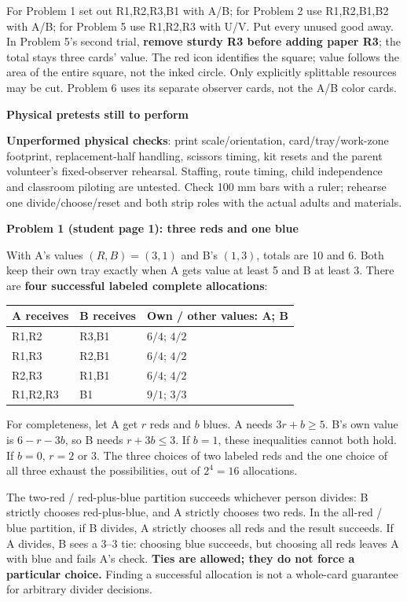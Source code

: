 \documentclass[11pt]{article}
\newcommand{\heading}[1]{\par\vspace{1.5mm}{\large\bfseries #1}\par\vspace{.8mm}}
\newcommand{\subhead}[1]{\par\vspace{1mm}\textbf{#1}\par}
\newcommand{\page}[1]{\newpage\heading{#1}}
\begin{document}
For Problem 1 set out R1,R2,R3,B1 with A/B; for Problem 2 use R1,R2,B1,B2 with A/B; for Problem 5 use R1,R2,R3 with U/V. Put every unused good away. In Problem 5's second trial, \textbf{remove sturdy R3 before adding paper R3}; the total stays three cards' value. The red icon identifies the square; value follows the area of the entire square, not the inked circle. Only explicitly splittable resources may be cut. Problem 6 uses its separate observer cards, not the A/B color cards.

\subhead{Physical pretests still to perform}
\textbf{Unperformed physical checks}: print scale/orientation, card/tray/work-zone footprint, replacement-half handling, scissors timing, kit resets and the parent volunteer's fixed-observer rehearsal. Staffing, route timing, child independence and classroom piloting are untested. Check 100 mm bars with a ruler; rehearse one divide/choose/reset and both strip roles with the actual adults and materials.

\page{Problems 1 and 2: whole-card allocations}
\subhead{Problem 1 (student page 1): three reds and one blue}
With A's values $(R,B)=(3,1)$ and B's $(1,3)$, totals are 10 and 6. Both keep their own tray exactly when A gets value at least 5 and B at least 3. There are \textbf{four successful labeled complete allocations}:

\begin{tabularx}{\linewidth}{@{}L{31mm}L{33mm}X@{}}\toprule
A receives & B receives & Own / other values: A; B\\\midrule
R1,R2 & R3,B1 & $6/4$; $4/2$\\
R1,R3 & R2,B1 & $6/4$; $4/2$\\
R2,R3 & R1,B1 & $6/4$; $4/2$\\
R1,R2,R3 & B1 & $9/1$; $3/3$\\\bottomrule
\end{tabularx}

For completeness, let A get $r$ reds and $b$ blues. A needs $3r+b\ge5$. B's own value is $6-r-3b$, so B needs $r+3b\le3$. If $b=1$, these inequalities cannot both hold. If $b=0$, $r=2$ or 3. The three choices of two labeled reds and the one choice of all three exhaust the possibilities, out of $2^4=16$ allocations.

The two-red / red-plus-blue partition succeeds whichever person divides: B strictly chooses red-plus-blue, and A strictly chooses two reds. In the all-red / blue partition, if B divides, A strictly chooses all reds and the result succeeds. If A divides, B sees a $3$--$3$ tie: choosing blue succeeds, but choosing all reds leaves A with blue and fails A's check. \textbf{Ties are allowed; they do not force a particular choice.} Finding a successful allocation is not a whole-card guarantee for arbitrary divider decisions.
\end{document}
